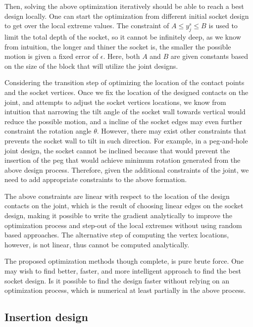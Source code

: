 Then, solving the above optimization iteratively should be able to reach a best design locally. One can start the optimization from different initial socket design to get over the local extreme values. The constraint of $A \leq y^s_j\leq B$ is used to limit the total depth of the socket, so it cannot be infinitely deep, as we know from intuition, the longer and thiner the socket is, the smaller the possible motion is given a fixed error of $\epsilon$. Here, both $A$ and $B$ are given constants based on the size of the block that will utilize the joint designs. 

Considering the transition step of optimizing the location of the contact points and the socket vertices. Once we fix the location of the designed contacts on the joint, and attempts to adjust the socket vertices locations, we know from intuition that narrowing the tilt angle of the socket wall towards vertical would reduce the possible motion, and a incline of the socket edges may even further constraint the rotation angle $\theta$. However, there may exist other constraints that prevents the socket wall to tilt in such direction. For example, in a peg-and-hole joint design, the socket cannot be inclined because that would prevent the insertion of the peg that would achieve minimum rotation generated from the above design process. Therefore, given the additional constraints of the joint, we need to add appropriate constraints to the above formation. 

The above constraints are linear with respect to the location of the design contacts on the joint, which is the result of choosing linear edges on the socket design, making it possible to write the gradient analytically to improve the optimization process and step-out of the local extremes without using random based approaches. The alternative step of computing the vertex locations, however, is not linear, thus cannot be computed analytically. 


The proposed optimization methods though complete, is pure brute force. One may wish to find better, faster, and more intelligent approach to find the best socket design. Is it possible to find the design faster without relying on an optimization process, which is numerical at least partially in the above process. 



\subsection{Insertion design}

